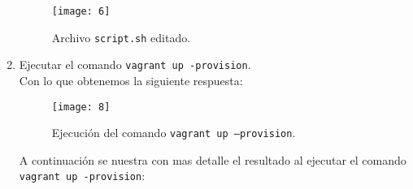 \documentclass[10pt]{article}   			%
\begin{document}
\begin{enumerate}
			\begin{figure}[H] 
				\centering
				\texttt{[image: 6]}   
				\caption{Archivo \texttt{script.sh} editado.} 
			\end{figure}	
	
\item Ejecutar el comando \texttt{vagrant up -provision}.\\


Con lo que obtenemos la siguiente respuesta:

\begin{figure}[H] 
	\centering
	\texttt{[image: 8]}   
	\caption{Ejecución del comando \texttt{vagrant up –provision}.} 
\end{figure}

A continuación se nuestra con mas detalle el resultado al ejecutar el comando  \texttt{vagrant up -provision}:\\
 

\end{enumerate}
\end{document}

